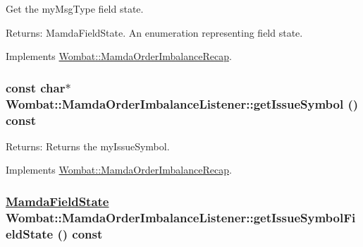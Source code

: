 Get the my\-Msg\-Type field state. 

\begin{Desc}
\item[Returns:]Mamda\-Field\-State. An enumeration representing field state. \end{Desc}


Implements \hyperlink{classWombat_1_1MamdaOrderImbalanceRecap_458ec8a6c2f84a218af924a747f1a410}{Wombat::Mamda\-Order\-Imbalance\-Recap}.\hypertarget{classWombat_1_1MamdaOrderImbalanceListener_3cbc1356e4c8a1e6287aa4fd39124cbd}{
\subsubsection[getIssueSymbol]{\setlength{\rightskip}{0pt plus 5cm}const char$\ast$ Wombat::Mamda\-Order\-Imbalance\-Listener::get\-Issue\-Symbol () const}}
\label{classWombat_1_1MamdaOrderImbalanceListener_3cbc1356e4c8a1e6287aa4fd39124cbd}


\begin{Desc}
\item[Returns:]Returns the my\-Issue\-Symbol. \end{Desc}


Implements \hyperlink{classWombat_1_1MamdaOrderImbalanceRecap_7a63844c647b4b13d5f2d07f5e27d719}{Wombat::Mamda\-Order\-Imbalance\-Recap}.\hypertarget{classWombat_1_1MamdaOrderImbalanceListener_e65164421eb2d6835ada9d3185734021}{
\subsubsection[getIssueSymbolFieldState]{\setlength{\rightskip}{0pt plus 5cm}\hyperlink{namespaceWombat_93aac974f2ab713554fd12a1fa3b7d2a}{Mamda\-Field\-State} Wombat::Mamda\-Order\-Imbalance\-Listener::get\-Issue\-Symbol\-Field\-State () const}}
\label{classWombat_1_1MamdaOrderImbalanceListener_e65164421eb2d6835ada9d3185734021}


